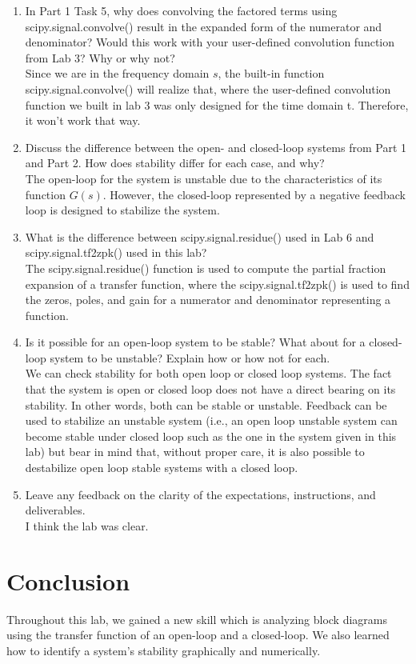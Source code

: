 \documentclass[12pt]{report}
\begin{document}
\begin{enumerate}
    \item 
    In Part 1 Task 5, why does convolving the factored terms using scipy.signal.convolve() result in the expanded form of the numerator and denominator? Would this work with your user-defined convolution function from Lab 3? Why or why not?\\
    Since we are in the frequency domain $s$, the built-in function scipy.signal.convolve() will realize that, where the user-defined convolution function we built in lab 3 was only designed for the time domain t. Therefore, it won't work that way.
    
    \item
    Discuss the difference between the open- and closed-loop systems from Part 1 and Part 2. How does stability differ for each case, and why?\\
    The open-loop for the system is unstable due to the characteristics of its function $G(s)$. However, the closed-loop represented by a negative feedback loop is designed to stabilize the system. 
    
    \item
    What is the difference between scipy.signal.residue() used in Lab 6 and scipy.signal.tf2zpk() used in this lab?\\
    The scipy.signal.residue() function is used to compute the partial fraction expansion of a transfer function, where the scipy.signal.tf2zpk() is used to find the zeros, poles, and gain for a numerator and denominator representing a function.
    
    \item
    Is it possible for an open-loop system to be stable? What about for a closed-loop system to be unstable? Explain how or how not for each.\\
    We can check stability for both open loop or closed loop systems. The fact that the system is open or closed loop does not have a direct bearing on its stability. In other words, both can be stable or unstable. Feedback can be used to stabilize an unstable system (i.e., an open loop unstable system can become stable under closed loop such as the one in the system given in this lab) but bear in mind that, without proper care, it is also possible to destabilize open loop stable systems with a closed loop.
    

    \item
    Leave any feedback on the clarity of the expectations, instructions, and deliverables.\\
    I think the lab was clear.
\end{enumerate}

\section{Conclusion}
Throughout this lab, we gained a new skill which is analyzing block diagrams using the transfer function of an open-loop and a closed-loop. We also learned how to identify a system's stability graphically and numerically. 
\end{document}
